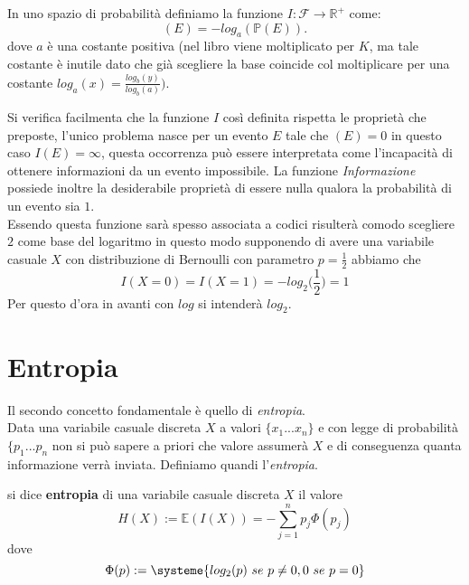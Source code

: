 \begin{defi}
In uno spazio di probabilità \spacep definiamo la funzione $I: \mathcal{F}\to \mathbb{R}^+$ come:
\begin{equation}
(E)=-log_a(\mathbb{P} (E)).
\end{equation}
dove $a$ è una costante positiva (nel libro viene moltiplicato per $K$,  ma tale costante è inutile dato che già scegliere la base coincide col moltiplicare per una costante $log_a(x)=\frac{log_b(y)}{log_b(a)} \bigg)$.
\end{defi}

Si verifica facilmenta che la funzione $I$ così definita rispetta le proprietà che preposte, l'unico problema nasce per un evento $E$ tale che \p $(E)=0$ in questo caso $I(E)=\infty$, questa occorrenza può essere interpretata come l'incapacità di ottenere informazioni da un evento impossibile. La funzione \textit{Informazione} possiede inoltre la desiderabile proprietà di essere nulla qualora la probabilità di un evento sia $1$.\\
Essendo questa funzione sarà spesso associata a codici risulterà comodo scegliere $2$ come base del logaritmo in questo modo supponendo di avere una variabile casuale $X$ con distribuzione di Bernoulli con parametro $p=\frac{1}{2}$ abbiamo che 
\begin{equation}
I(X=0)=I(X=1)=-log_2 \bigg(\frac{1}{2} \bigg ) =1
\end{equation}
Per questo d'ora in avanti con $log$ si intenderà $log_2$.
 




\section{Entropia}
\label{sec:Entropia}

Il secondo concetto fondamentale è quello di \textit{entropia}.\\
Data una variabile casuale discreta $X$ a valori $\{ x_1...x_n \}$ e con legge di probabilità $\{p_1...p_n$ non si può sapere a priori che valore assumerà $X$ e di conseguenza quanta informazione verrà inviata. Definiamo quandi l'\textit{entropia}.

\begin{defi}
si dice \textbf{entropia} di una variabile casuale discreta $X$ il valore
\begin{equation}
H(X):=\mathbb{E}(I(X))=-\sum_{j=1}^np_j\Phi(p_j)
\end{equation}
dove
$$\Phi(p):=
\systeme{
log_2(p)\ se \ p \neq 0 ,
0 \ se \  p=0}
$$
\end{defi}

